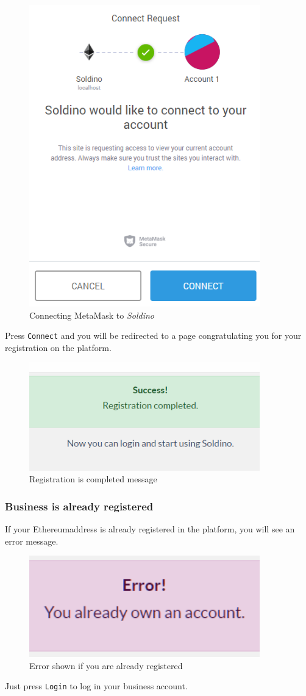 	\begin{figure}[H]
		\includegraphics[width=10cm]{res/images/metamask_connect.png}
		\centering
		\caption{Connecting MetaMask to \textit{Soldino}}
	\end{figure}
	\noindent \noindent Press \texttt{Connect} and you will be redirected to a page 
	congratulating you for your registration on the platform.
	\begin{figure}[H]
		\includegraphics[width=10cm]{res/images/registration_complete.png}
		\centering
		\caption{Registration is completed message}
	\end{figure}
		\subsubsection{Business is already registered}
		If your Ethereum\glosp address is already registered in the platform, you will 
		see an error message.
		\begin{figure}[H]
			\includegraphics[width=10cm]{res/images/user_already_registered.png}
			\centering
			\caption{Error shown if you are already registered}
		\end{figure}
		\noindent Just press \texttt{Login} to log in your business account.
